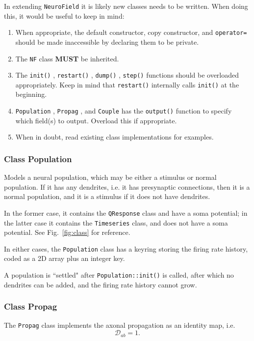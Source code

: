 \documentclass[12pt,a4paper]{article}
\newcommand{\type}[1]{ {\small\small\tt #1} }
\begin{document}
In extending \type{NeuroField} it is likely new classes needs to be written. When doing this, it would be useful to keep in mind:
\begin{enumerate}
	\item When appropriate, the default constructor, copy constructor, and \type{operator=} should be made inaccessible by declaring them to be private.
	\item The \type{NF} class \textbf{MUST} be inherited.
	\item The \type{init()}, \type{restart()}, \type{dump()}, \type{step()} functions should be overloaded appropriately. Keep in mind that \type{restart()} internally calls \type{init()} at the beginning.
	\item \type{Population}, \type{Propag}, and \type{Couple} has the \type{output()} function to specify which field(s) to output. Overload this if appropriate.
	\item When in doubt, read existing class implementations for examples.
\end{enumerate}

\subsubsection{Class Population}
\label{sec:pop}

Models a neural population, which may be either a stimulus or normal population. If it has any dendrites, i.e. it has presynaptic connections, then it is a normal population, and it is a stimulus if it does not have dendrites.

In the former case, it contains the \type{QResponse} class and have a soma potential; in the latter case it contains the \type{Timeseries} class, and does not have a soma potential. See Fig.~\ref{fig:class} for reference.

In either cases, the \type{Population} class has a keyring storing the firing rate history, coded as a 2D array plus an integer key.

A population is ``settled" after \type{Population::init()} is called, after which no dendrites can be added, and the firing rate history cannot grow.

\subsubsection{Class Propag}
\label{sec:propag}

The \type{Propag} class implements the axonal propagation as an identity map, i.e.
\[ \mathcal{D}_{ab} = 1. \]
\end{document}
